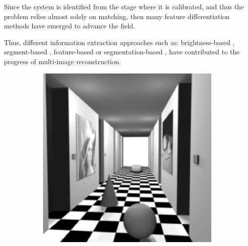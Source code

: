 Since the system is identified from the stage where it is calibrated, and thus the problem relies almost solely on matching, then many feature differentiation methods have emerged to advance the field.


Thus, different information extraction approaches such as: brightness-based \cite{gennert1988brightness}, segment-based \cite{sumi20023d}, feature-based \cite{se2001vision} or segmentation-based \cite{bleyer2004layered}, have contributed to the progress of multi-image reconstruction.

\begin{figure}[h]
	\centering
	\begin{subfigure}{.3\textwidth}
		\centering
		\includegraphics[width=\linewidth]{Figures/SOA/wood1.png}
	\end{subfigure}
	\begin{subfigure}{.3\textwidth}
		

\end{subfigure}
\end{figure}
